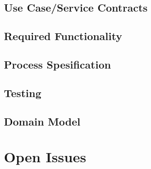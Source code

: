 \documentclass[12pt]{article}
\begin{document}
\subsection{Use Case/Service Contracts}

\subsection{Required Functionality}

\subsection{Process Spesification}

\subsection{Testing}

\subsection{Domain Model}


\section{Open Issues}
\end{document}
